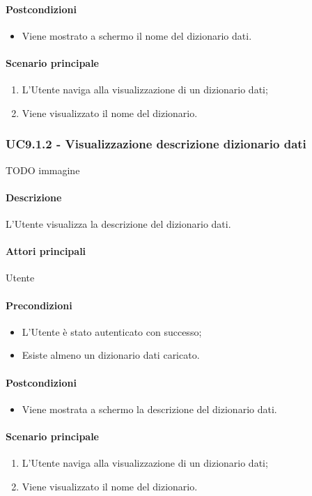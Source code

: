\paragraph*{Postcondizioni}
\begin{itemize}
  \item Viene mostrato a schermo il nome del dizionario dati.
\end{itemize}
\paragraph*{Scenario principale}
\begin{enumerate}
  \item L’Utente naviga alla visualizzazione di un dizionario dati;
  \item Viene visualizzato il nome del dizionario.  
\end{enumerate}


\subsubsection{UC9.1.2 - Visualizzazione descrizione dizionario dati}\label{UC9point1point2}
TODO immagine\paragraph*{Descrizione}
L’Utente visualizza la descrizione del dizionario dati.
\paragraph*{Attori principali} Utente
\paragraph*{Precondizioni}
\begin{itemize}
  \item L’Utente è stato autenticato con successo;
  \item Esiste almeno un dizionario dati caricato.
\end{itemize}
\paragraph*{Postcondizioni}
\begin{itemize}
  \item Viene mostrata a schermo la descrizione del dizionario dati.
\end{itemize}
\paragraph*{Scenario principale}
\begin{enumerate}
  \item L’Utente naviga alla visualizzazione di un dizionario dati;
  \item Viene visualizzato il nome del dizionario.
\end{enumerate}

